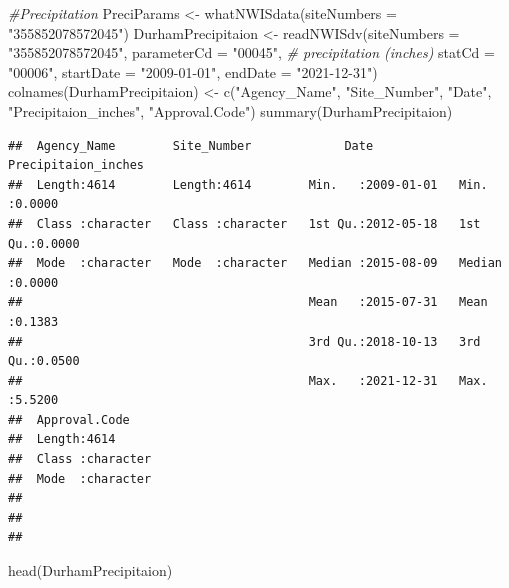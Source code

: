 \documentclass[
  12pt,
]{article}
\newenvironment{Shaded}{\begin{snugshade}}{\end{snugshade}}
\newcommand{\AttributeTok}[1]{\textcolor[rgb]{0.77,0.63,0.00}{#1}}
\newcommand{\CommentTok}[1]{\textcolor[rgb]{0.56,0.35,0.01}{\textit{#1}}}
\newcommand{\FunctionTok}[1]{\textcolor[rgb]{0.00,0.00,0.00}{#1}}
\newcommand{\NormalTok}[1]{#1}
\newcommand{\OtherTok}[1]{\textcolor[rgb]{0.56,0.35,0.01}{#1}}
\newcommand{\StringTok}[1]{\textcolor[rgb]{0.31,0.60,0.02}{#1}}
\begin{document}
\begin{Shaded}
\begin{Highlighting}[]
\CommentTok{\#Precipitation}
\NormalTok{PreciParams }\OtherTok{\textless{}{-}} \FunctionTok{whatNWISdata}\NormalTok{(}\AttributeTok{siteNumbers =} \StringTok{"355852078572045"}\NormalTok{)}
\NormalTok{DurhamPrecipitaion }\OtherTok{\textless{}{-}} \FunctionTok{readNWISdv}\NormalTok{(}\AttributeTok{siteNumbers =} \StringTok{"355852078572045"}\NormalTok{,}
                                 \AttributeTok{parameterCd =} \StringTok{"00045"}\NormalTok{, }
                                 \CommentTok{\# precipitation (inches)}
                                 \AttributeTok{statCd =} \StringTok{"00006"}\NormalTok{,}
                                 \AttributeTok{startDate =} \StringTok{"2009{-}01{-}01"}\NormalTok{,}
                                 \AttributeTok{endDate =} \StringTok{"2021{-}12{-}31"}\NormalTok{)}
\FunctionTok{colnames}\NormalTok{(DurhamPrecipitaion) }\OtherTok{\textless{}{-}} \FunctionTok{c}\NormalTok{(}\StringTok{"Agency\_Name"}\NormalTok{,}
                                 \StringTok{"Site\_Number"}\NormalTok{,}
                                 \StringTok{"Date"}\NormalTok{,}
                                 \StringTok{"Precipitaion\_inches"}\NormalTok{, }
                                 \StringTok{"Approval.Code"}\NormalTok{)}
\FunctionTok{summary}\NormalTok{(DurhamPrecipitaion)}
\end{Highlighting}
\end{Shaded}

\begin{verbatim}
##  Agency_Name        Site_Number             Date            Precipitaion_inches
##  Length:4614        Length:4614        Min.   :2009-01-01   Min.   :0.0000     
##  Class :character   Class :character   1st Qu.:2012-05-18   1st Qu.:0.0000     
##  Mode  :character   Mode  :character   Median :2015-08-09   Median :0.0000     
##                                        Mean   :2015-07-31   Mean   :0.1383     
##                                        3rd Qu.:2018-10-13   3rd Qu.:0.0500     
##                                        Max.   :2021-12-31   Max.   :5.5200     
##  Approval.Code     
##  Length:4614       
##  Class :character  
##  Mode  :character  
##                    
##                    
## 
\end{verbatim}

\begin{Shaded}
\begin{Highlighting}[]
\FunctionTok{head}\NormalTok{(DurhamPrecipitaion)}
\end{Highlighting}
\end{Shaded}
\end{document}
